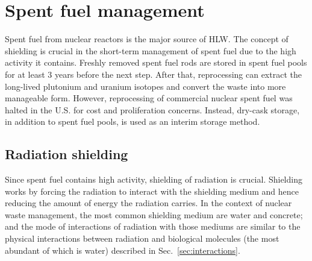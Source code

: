 \documentclass[nofootinbib,preprint,aps]{revtex4-1}
\begin{document}
    \section{Spent fuel management}
    \label{sec:temp}
    Spent fuel from nuclear reactors is the major source of HLW.
    The concept of shielding is crucial in the short-term management of spent fuel due to the high activity
    it contains. Freshly removed spent fuel rods are stored in spent fuel pools for at least $3$ years before
    the next step. After that, reprocessing can extract the long-lived plutonium and uranium isotopes and
    convert the waste into more manageable form. However, reprocessing of commercial
    nuclear spent fuel was halted in the U.S. for cost and proliferation concerns. Instead, dry-cask
    storage, in addition to spent fuel pools, is used as an interim storage method.
    \subsection{Radiation shielding}
    Since spent fuel contains high activity, shielding of radiation is crucial. Shielding works by
    forcing the radiation to interact with the shielding medium and hence reducing the amount of energy
    the radiation carries. In the context of nuclear waste management, the most common shielding medium
    are water and concrete; and the mode of interactions of radiation with those mediums are similar to
    the physical interactions between radiation and biological molecules (the most abundant of which is
    water) described in Sec.~\ref{sec:interactions}.
\end{document}
